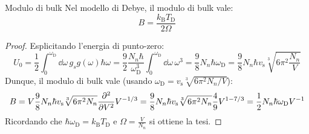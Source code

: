 \begin{proposition}{Modulo di bulk}{}
	Nel modello di Debye, il modulo di bulk vale:
	\begin{equation}
		B = \frac{k_\text{B} T_\text{D}}{2 \Omega}
	\end{equation}

	\tcblower

	\begin{proof}
		Esplicitando l'energia di punto-zero:
		\begin{equation*}
			U_0 = \frac{1}{2} \int_0^{\omega_\text{D}} \dd\omega\, g_s g(\omega) \hbar \omega = \frac{9}{2} \frac{N_n \hbar}{\omega_\text{D}^3} \int_0^{\omega_\text{D}} \dd\omega\, \omega^3 = \frac{9}{8} N_n \hbar \omega_\text{D} = \frac{9}{8} N_n \hbar v_\text{s} \sqrt[3]{6\pi^2 \frac{N_n}{V}}
		\end{equation*}
		Dunque, il modulo di bulk vale (usando $ \omega_\text{D} = v_\text{s} \sqrt[3]{6\pi^2 N_n / V} $):
		\begin{equation*}
			B = V \frac{9}{8} N_n \hbar v_\text{s} \sqrt[3]{6\pi^2 N_n} \frac{\partial^2}{\partial V^2} V^{-1/3} = \frac{9}{8} N_n \hbar v_\text{s} \sqrt[3]{6\pi^2 N_n} \frac{4}{9} V^{1-7/3} = \frac{1}{2} N_n \hbar \omega_\text{D} V^{-1}
		\end{equation*}
		Ricordando che $ \hbar \omega_\text{D} = k_\text{B} T_\text{D} $ e $ \Omega = \frac{V}{N_n} $ si ottiene la tesi.
	\end{proof}
\end{proposition}










